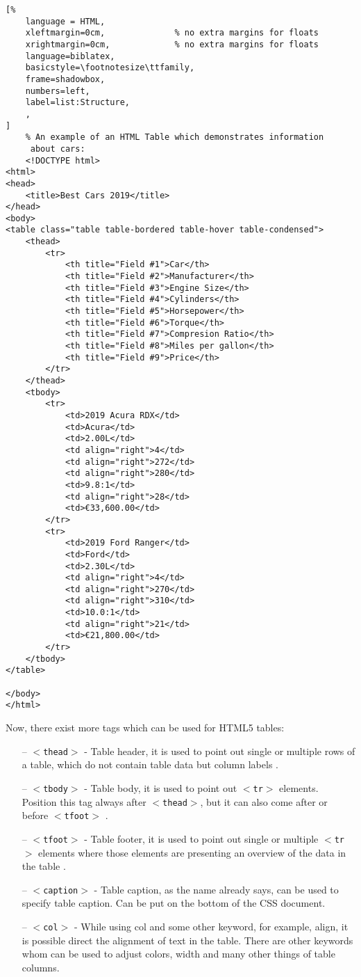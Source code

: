 \begin{lstlisting}[%
    language = HTML,
    xleftmargin=0cm,              % no extra margins for floats
    xrightmargin=0cm,             % no extra margins for floats
    language=biblatex,
    basicstyle=\footnotesize\ttfamily,
    frame=shadowbox,
    numbers=left,
    label=list:Structure,
    ,
]
    % An example of an HTML Table which demonstrates information
     about cars:
    <!DOCTYPE html>
<html>
<head>
	<title>Best Cars 2019</title>
</head>
<body>
<table class="table table-bordered table-hover table-condensed">
	<thead>
		<tr>
			<th title="Field #1">Car</th>
			<th title="Field #2">Manufacturer</th>
			<th title="Field #3">Engine Size</th>
			<th title="Field #4">Cylinders</th>
			<th title="Field #5">Horsepower</th>
			<th title="Field #6">Torque</th>
			<th title="Field #7">Compresion Ratio</th>
			<th title="Field #8">Miles per gallon</th>
			<th title="Field #9">Price</th>
		</tr>
	</thead>
	<tbody>
		<tr>
			<td>2019 Acura RDX</td>
			<td>Acura</td>
			<td>2.00L</td>
			<td align="right">4</td>
			<td align="right">272</td>
			<td align="right">280</td>
			<td>9.8:1</td>
			<td align="right">28</td>
			<td>€33,600.00</td>
		</tr>
		<tr>
			<td>2019 Ford Ranger</td>
			<td>Ford</td>
			<td>2.30L</td>
			<td align="right">4</td>
			<td align="right">270</td>
			<td align="right">310</td>
			<td>10.0:1</td>
			<td align="right">21</td>
			<td>€21,800.00</td>
		</tr>
	</tbody>
</table>

</body>
</html>

\end{lstlisting}

Now, there exist more tags which can be used for HTML5 tables:
\begin{itemize}
    \item[--] $<$\texttt{thead}$>$ - Table header, it is used to point
out single or multiple rows of a table, which do not contain table
data but column labels \parencite{ChrisCoyier}.

    \item[--] $<$\texttt{tbody}$>$ - Table body, it is used to point
out $<$\texttt{tr}$>$ elements. Position this tag always after
$<$\texttt{thead}$>$, but it can also come after or before
$<$\texttt{tfoot}$>$ \parencite{ChrisCoyier}.

    \item[--] $<$\texttt{tfoot}$>$ - Table footer, it is used to point
out single or multiple $<$\texttt{tr}$>$ elements where those elements
are presenting an overview  of the data in the table
\parencite{ChrisCoyier}.

    \item[--] $<$\texttt{caption}$>$ - Table caption, as the name
already says, can be used to specify table caption. Can be put on the
bottom of the CSS document.

    \item[--] $<$\texttt{col}$>$ - While using col and some other
keyword, for example, align, it is possible direct the alignment of
text in the table. There are other keywords whom can be used to adjust
colors, width and many other things of table columns.
\end{itemize}

